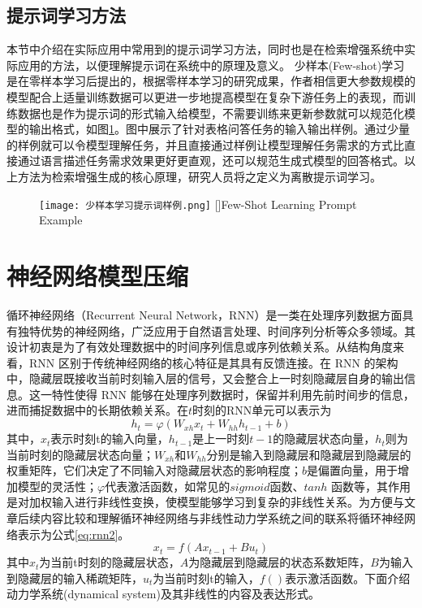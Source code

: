 \subsection{提示词学习方法}

本节中介绍在实际应用中常用到的提示词学习方法，同时也是在检索增强系统中实际应用的方法，以便理解提示词在系统中的原理及意义。
少样本(Few-shot)学习是在零样本学习后提出的，根据零样本学习的研究成果，作者相信更大参数规模的模型配合上适量训练数据可以更进一步地提高模型在复杂下游任务上的表现，而训练数据也是作为提示词的形式输入给模型，不需要训练来更新参数就可以规范化模型的输出格式，如图\ref{fig: 少样本学习提示词样例}。图中展示了针对表格问答任务的输入输出样例。通过少量的样例就可以令模型理解任务，并且直接通过样例让模型理解任务需求的方式比直接通过语言描述任务需求效果更好更直观，还可以规范生成式模型的回答格式。以上方法为检索增强生成的核心原理，研究人员将之定义为离散提示词学习。
\begin{figure}[htbp]
  \centering
  \texttt{[image: 少样本学习提示词样例.png]}
  []{Few-Shot Learning Prompt Example}
  \label{fig: 少样本学习提示词样例}
\end{figure}


\section{神经网络模型压缩}
循环神经网络（Recurrent Neural Network，RNN）是一类在处理序列数据方面具有独特优势的神经网络，广泛应用于自然语言处理、时间序列分析等众多领域。其设计初衷是为了有效处理数据中的时间序列信息或序列依赖关系。从结构角度来看，RNN 区别于传统神经网络的核心特征是其具有反馈连接。在 RNN 的架构中，隐藏层既接收当前时刻输入层的信号，又会整合上一时刻隐藏层自身的输出信息。这一特性使得 RNN 能够在处理序列数据时，保留并利用先前时间步的信息，进而捕捉数据中的长期依赖关系。在$t$时刻的RNN单元可以表示为
\begin{equation}
  \label{eq:rnn}
  {h_t} = \varphi ({W_{xh}}{x_t} + {W_{hh}}{h_{t - 1}} + b)
\end{equation}
其中，$x_t$表示时刻t的输入向量，$h_{t-1}$是上一时刻$t-1$的隐藏层状态向量，$h_t$则为当前时刻的隐藏层状态向量；$W_{xh}$和$W_{hh}$分别是输入到隐藏层和隐藏层到隐藏层的权重矩阵，它们决定了不同输入对隐藏层状态的影响程度；$b$是偏置向量，用于增加模型的灵活性；$\varphi$代表激活函数，如常见的$sigmoid$函数、$tanh$ 函数等，其作用是对加权输入进行非线性变换，使模型能够学习到复杂的非线性关系。为方便与文章后续内容比较和理解循环神经网络与非线性动力学系统之间的联系将循环神经网络表示为公式\ref{eq:rnn2}。
\begin{equation}
  \label{eq:rnn2}
  {x_t} = f(A{x_{t - 1}} + B{u_t})
\end{equation}
其中$x_t$为当前t时刻的隐藏层状态，$A$为隐藏层到隐藏层的状态系数矩阵，$B$为输入到隐藏层的输入稀疏矩阵，$u_t$为当前时刻t的输入，$f()$表示激活函数。下面介绍动力学系统(dynamical system)及其非线性的内容及表达形式。

